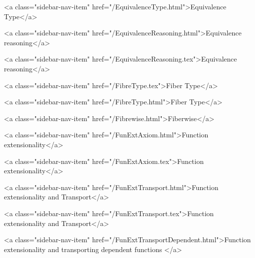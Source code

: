       
    
      
        
          <a class="sidebar-nav-item" href="/EquivalenceType.html">Equivalence Type</a>
        
      
    
      
        
          <a class="sidebar-nav-item" href="/EquivalenceReasoning.html">Equivalence reasoning</a>
        
      
    
      
        
          <a class="sidebar-nav-item" href="/EquivalenceReasoning.tex">Equivalence reasoning</a>
        
      
    
      
        
          <a class="sidebar-nav-item" href="/FibreType.tex">Fiber Type</a>
        
      
    
      
        
          <a class="sidebar-nav-item" href="/FibreType.html">Fiber Type</a>
        
      
    
      
        
          <a class="sidebar-nav-item" href="/Fibrewise.html">Fiberwise</a>
        
      
    
      
        
          <a class="sidebar-nav-item" href="/FunExtAxiom.html">Function extensionality</a>
        
      
    
      
        
          <a class="sidebar-nav-item" href="/FunExtAxiom.tex">Function extensionality</a>
        
      
    
      
        
          <a class="sidebar-nav-item" href="/FunExtTransport.html">Function extensionality and Transport</a>
        
      
    
      
        
          <a class="sidebar-nav-item" href="/FunExtTransport.tex">Function extensionality and Transport</a>
        
      
    
      
        
          <a class="sidebar-nav-item" href="/FunExtTransportDependent.html">Function extensionality and transporting dependent functions </a>
        
